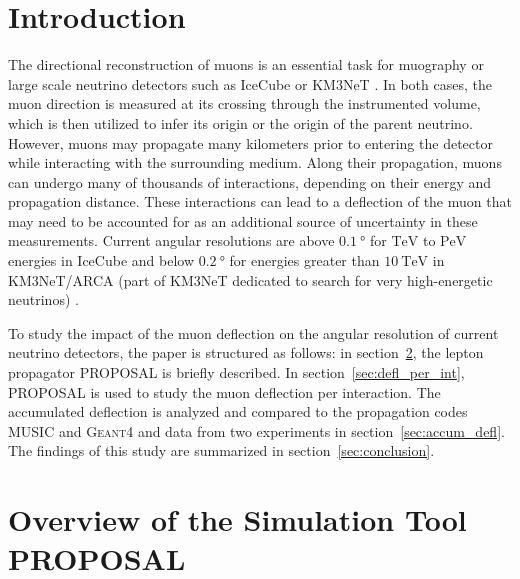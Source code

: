 \section{Introduction}\label{sec:introduction}

The directional reconstruction of muons is an essential task for muography or large scale neutrino detectors such as IceCube 
\cite{IceCube_Instrumentation} or KM3NeT \cite{KM3NeT_Design}. In both cases, the muon direction is measured at its crossing through the instrumented volume, which is then utilized to infer its origin or the origin of the parent neutrino. 
However, muons may propagate many kilometers prior to entering the detector while interacting with the surrounding medium. 
Along their propagation, muons can undergo many of thousands 
of interactions, depending on their energy and propagation distance. 
These interactions can lead to a deflection of the muon that may need to be accounted for as an additional source of uncertainty in these measurements. 
Current angular resolutions are above
$\SI{0.1}{\degree}$ for  
$\si{\tera\electronvolt}$ to $\si{\peta\electronvolt}$ energies in IceCube 
\cite{IceCube_Resolution2021} 
and below 
$\SI{0.2}{\degree}$ for energies greater than $\SI{10}{\tera\electronvolt}$ in 
KM3NeT/ARCA (part of KM3NeT dedicated to search for very high-energetic neutrinos) \cite{KM3NeT_Resolution2021}.

To study the impact of the muon deflection on the angular resolution 
of current neutrino detectors, 
the paper is structured as follows: in section~\ref{sec:proposal},
the lepton propagator PROPOSAL is briefly described. In section~\ref{sec:defl_per_int},
PROPOSAL \cite{koehne2013proposal, dunsch_2018_proposal_improvements} is used to study the muon deflection per interaction.
The accumulated deflection is analyzed and compared to the propagation codes
MUSIC \cite{MUSIC, comparison_MUSIC_GEANT4_2009} and \textsc{Geant4} \cite{GEANT4_standard, GEANT4} and data from two experiments in section~\ref{sec:accum_defl}. The findings of this study
are summarized in section~\ref{sec:conclusion}.

\section{Overview of the Simulation Tool PROPOSAL}\label{sec:proposal}

